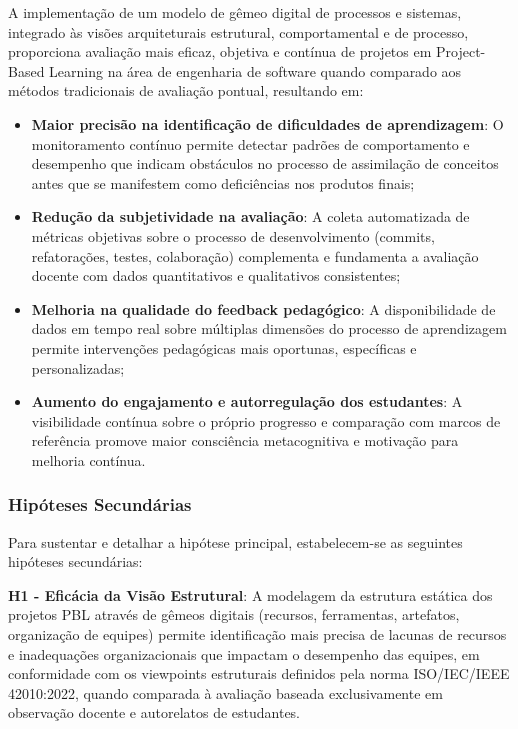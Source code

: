 \documentclass[12pt, a4paper, oneside, brazilian]{abntex2}
\begin{document}
A implementação de um modelo de gêmeo digital de processos e sistemas, integrado às visões arquiteturais estrutural, comportamental e de processo, proporciona avaliação mais eficaz, objetiva e contínua de projetos em Project-Based Learning na área de engenharia de software quando comparado aos métodos tradicionais de avaliação pontual, resultando em:

\begin{itemize}
\item \textbf{Maior precisão na identificação de dificuldades de aprendizagem}: O monitoramento contínuo permite detectar padrões de comportamento e desempenho que indicam obstáculos no processo de assimilação de conceitos antes que se manifestem como deficiências nos produtos finais;

\item \textbf{Redução da subjetividade na avaliação}: A coleta automatizada de métricas objetivas sobre o processo de desenvolvimento (commits, refatorações, testes, colaboração) complementa e fundamenta a avaliação docente com dados quantitativos e qualitativos consistentes;

\item \textbf{Melhoria na qualidade do feedback pedagógico}: A disponibilidade de dados em tempo real sobre múltiplas dimensões do processo de aprendizagem permite intervenções pedagógicas mais oportunas, específicas e personalizadas;

\item \textbf{Aumento do engajamento e autorregulação dos estudantes}: A visibilidade contínua sobre o próprio progresso e comparação com marcos de referência promove maior consciência metacognitiva e motivação para melhoria contínua.
\end{itemize}

\subsubsection{Hipóteses Secundárias}

Para sustentar e detalhar a hipótese principal, estabelecem-se as seguintes hipóteses secundárias:

\textbf{H1 - Eficácia da Visão Estrutural}: A modelagem da estrutura estática dos projetos PBL através de gêmeos digitais (recursos, ferramentas, artefatos, organização de equipes) permite identificação mais precisa de lacunas de recursos e inadequações organizacionais que impactam o desempenho das equipes, em conformidade com os viewpoints estruturais definidos pela norma ISO/IEC/IEEE 42010:2022, quando comparada à avaliação baseada exclusivamente em observação docente e autorelatos de estudantes.
\end{document}
